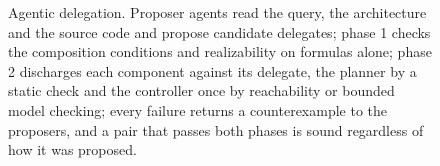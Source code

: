 \begin{figure}[t]
{}
\caption{Agentic delegation. Proposer agents read the query, the architecture and the source code and propose candidate delegates; phase 1 checks the composition conditions and realizability on formulas alone; phase 2 discharges each component against its delegate, the planner by a static check and the controller once by reachability or bounded model checking; every failure returns a counterexample to the proposers, and a pair that passes both phases is sound regardless of how it was proposed.}
\label{fig:agentic}
\end{figure}
